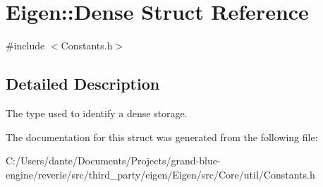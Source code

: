 \hypertarget{struct_eigen_1_1_dense}{}\section{Eigen\+::Dense Struct Reference}
\label{struct_eigen_1_1_dense}


{\ttfamily \#include $<$Constants.\+h$>$}



\subsection{Detailed Description}
The type used to identify a dense storage. 

The documentation for this struct was generated from the following file\+:\begin{DoxyCompactItemize}
\item 
C\+:/\+Users/dante/\+Documents/\+Projects/grand-\/blue-\/engine/reverie/src/third\+\_\+party/eigen/\+Eigen/src/\+Core/util/Constants.\+h\end{DoxyCompactItemize}
